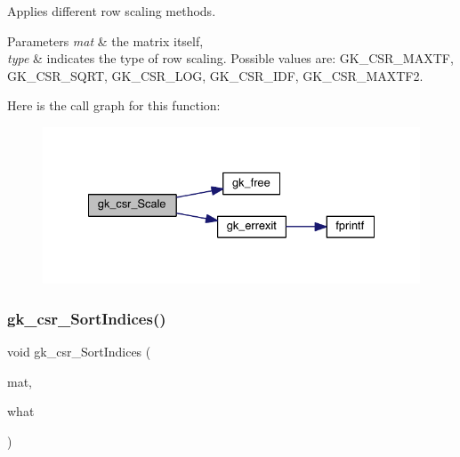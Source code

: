 Applies different row scaling methods. 
\begin{DoxyParams}{Parameters}
{\em mat} & the matrix itself, \\
\hline
{\em type} & indicates the type of row scaling. Possible values are\+: G\+K\+\_\+\+C\+S\+R\+\_\+\+M\+A\+X\+TF, G\+K\+\_\+\+C\+S\+R\+\_\+\+S\+Q\+RT, G\+K\+\_\+\+C\+S\+R\+\_\+\+L\+OG, G\+K\+\_\+\+C\+S\+R\+\_\+\+I\+DF, G\+K\+\_\+\+C\+S\+R\+\_\+\+M\+A\+X\+T\+F2. \\
\hline
\end{DoxyParams}
Here is the call graph for this function\+:\nopagebreak
\begin{figure}[H]
\begin{center}
\leavevmode
\includegraphics[width=332pt]{a00077_adf45acdb60028f87304c1edc75baf194_cgraph}
\end{center}
\end{figure}
\mbox{\label{a00077_a06ffa04d1369de42ae3b7d2a9f85b91d}} 
\subsubsection{\texorpdfstring{gk\+\_\+csr\+\_\+\+Sort\+Indices()}{gk\_csr\_SortIndices()}}
{\footnotesize\ttfamily void gk\+\_\+csr\+\_\+\+Sort\+Indices (\begin{DoxyParamCaption}\item[{\hyperlink{a00634}{gk\+\_\+csr\+\_\+t} $\ast$}]{mat,  }\item[{int}]{what }\end{DoxyParamCaption})}

